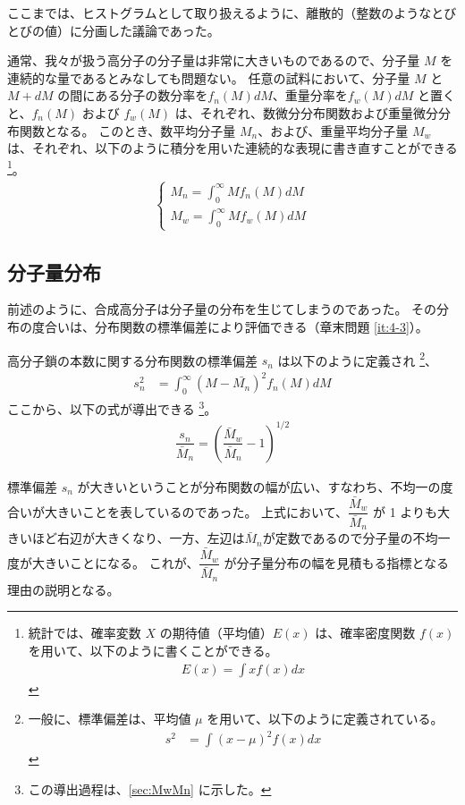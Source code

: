 \documentclass[a4paper,11pt]{ltjsarticle}
\begin{document}
ここまでは、ヒストグラムとして取り扱えるように、離散的（整数のようなとびとびの値）に分画した議論であった。

通常、我々が扱う高分子の分子量は非常に大きいものであるので、分子量 $M$ を連続的な量であるとみなしても問題ない。
任意の試料において、分子量 $M$ と $M+dM$ の間にある分子の数分率を$f_n(M)dM$、重量分率を$f_w(M)dM$ と置くと、$f_n(M)$ および $f_w(M)$ は、それぞれ、数微分分布関数および重量微分分布関数となる。
このとき、数平均分子量 $M_n$、および、重量平均分子量 $M_w$ は、それぞれ、以下のように積分を用いた連続的な表現に書き直すことができる
\footnote
{
統計では、確率変数 $X$ の期待値（平均値）$E(x)$ は、確率密度関数 $f(x)$ を用いて、以下のように書くことができる。
\begin{align*}
E(x) = \displaystyle \int x f(x) dx
\end{align*}
}。
\begin{align}
\begin{cases}
M_n = \displaystyle\int_0^{\infty} M f_n (M)dM \\[10pt]
M_w = \displaystyle\int_0^{\infty} M f_w (M)dM
\end{cases}
\end{align}

\subsection{分子量分布}

前述のように、合成高分子は分子量の分布を生じてしまうのであった。
その分布の度合いは、分布関数の標準偏差により評価できる（章末問題 \ref{it:4-3}）。

高分子鎖の本数に関する分布関数の標準偏差 $s_n$ は以下のように定義され
\footnote
{
一般に、標準偏差は、平均値 $\mu$ を用いて、以下のように定義されている。
\begin{align*}
s^2
	&= \displaystyle \int(x - \mu)^2 f(x) dx
\end{align*}
}、
\begin{align}
s_n^2
	&= \displaystyle \int_0^{\infty}(M - \bar{M_n})^2 f_n(M) dM
\end{align}
ここから、以下の式が導出できる
\footnote
{
この導出過程は、\ref{sec:MwMn} に示した。
}。
\begin{align}
\dfrac{s_n}{\bar{M}_n} = \left(\dfrac{\bar{M}_w}{\bar{M}_n}-1\right)^{1/2}
\end{align}

標準偏差 $s_n$ が大きいということが分布関数の幅が広い、すなわち、不均一の度合いが大きいことを表しているのであった。
上式において、$\dfrac{\bar{M}_w}{\bar{M}_n}$ が 1 よりも大きいほど右辺が大きくなり、一方、左辺は$\bar{M}_n$が定数であるので分子量の不均一度が大きいことになる。
これが、$\dfrac{\bar{M}_w}{\bar{M}_n}$ が分子量分布の幅を見積もる指標となる理由の説明となる。
 
\end{document}
